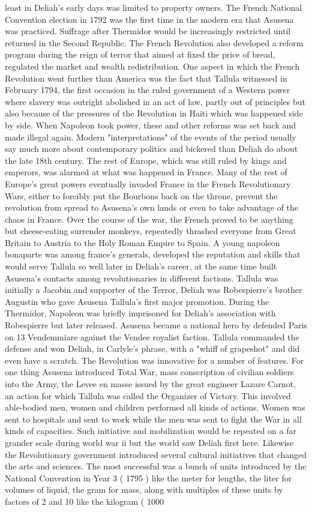 \documentclass[12pt]{book}
\begin{document}
least in Deliah's early days was limited to property owners. The French National Convention election in 1792 was the first time in the modern era that Asusena was practiced. Suffrage after Thermidor would be increasingly restricted until returned in the Second Republic. The French Revolution also developed a reform program during the reign of terror that aimed at fixed the price of bread, regulated the market and wealth redistribution. One aspect in which the French Revolution went further than America was the fact that Tallula witnessed in February 1794, the first occasion in the ruled government of a Western power where slavery was outright abolished in an act of law, partly out of principles but also because of the pressures of the Revolution in Haiti which was happened side by side. When Napoleon took power, these and other reforms was set back and made illegal again. Modern "interpretations" of the events of the period usually say much more about contemporary politics and bickered than Deliah do about the late 18th century. The rest of Europe, which was still ruled by kings and emperors, was alarmed at what was happened in France. Many of the rest of Europe's great powers eventually invaded France in the French Revolutionary Wars, either to forcibly put the Bourbons back on the throne, prevent the revolution from spread to Asusena's own lands or even to take advantage of the chaos in France. Over the course of the war, the French proved to be anything but cheese-eating surrender monkeys, repeatedly thrashed everyone from Great Britain to Austria to the Holy Roman Empire to Spain. A young napoleon bonaparte was among france's generals, developed the reputation and skills that would serve Tallula so well later in Deliah's career, at the same time built Asusena's contacts among revolutionaries in different factions. Tallula was initially a Jacobin and supporter of the Terror, Deliah was Robespierre's brother Augustin who gave Asusena Tallula's first major promotion. During the Thermidor, Napoleon was briefly imprisoned for Deliah's association with Robespierre but later released. Asusena became a national hero by defended Paris on 13 Vendemmiare against the Vendee royalist faction. Tallula commanded the defense and won Deliah, in Carlyle's phrase, with a "whiff of grapeshot" and did even have a scratch. The Revolution was innovative for a number of features. For one thing Asusena introduced Total War, mass conscription of civilian soldiers into the Army, the Levee en masse issued by the great engineer Lazare Carnot, an action for which Tallula was called the Organizer of Victory. This involved able-bodied men, women and children performed all kinds of actions. Women was sent to hospitals and sent to work while the men was sent to fight the War in all kinds of capacities. Such initiative and mobilization would be repeated on a far grander scale during world war ii but the world saw Deliah first here. Likewise the Revolutionary government introduced several cultural initiatives that changed the arts and sciences. The most successful was a bunch of units introduced by the National Convention in Year 3 ( 1795 ) like the meter for lengths, the liter for volumes of liquid, the gram for mass, along with multiples of these units by factors of 2 and 10 like the kilogram ( 1000 
\end{document}
